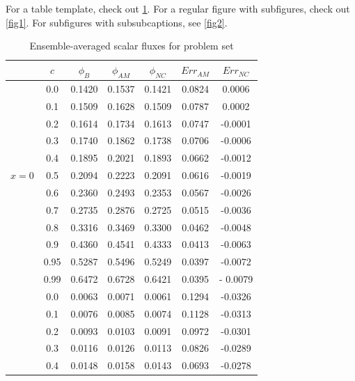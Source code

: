 \documentclass[12pt]{article}
\begin{document}
For a table template, check out \cref{tab1}. For a regular figure with subfigures, check out \cref{fig1}. For subfigures with subsubcaptions, see \cref{fig2}.

\pagebreak
\begin{singlespace}


\end{singlespace}

\begin{table}[p]
\centering
\caption{Ensemble-averaged scalar fluxes for problem set }
\label{tab1} 
\begin{tabular}{||c|c||c|c|c||c|c||} \hline \hline
  & $c$ & $\phi_B$ & $\phi_{AM}$ &$\phi_{NC}$ & $Err_{AM}$ & $ Err_{NC}$\\ \hline\hline
& 0.0 & 0.1420 & 0.1537 & 0.1421 & 0.0824 & 0.0006 \\
\cline{2-7}
& 0.1 & 0.1509 & 0.1628 & 0.1509 & 0.0787 & 0.0002 \\
\cline{2-7}
& 0.2 & 0.1614 & 0.1734 & 0.1613 & 0.0747 & -0.0001 \\
\cline{2-7}
& 0.3 & 0.1740 & 0.1862 & 0.1738 & 0.0706 & -0.0006 \\
\cline{2-7}
& 0.4 & 0.1895 & 0.2021 & 0.1893 & 0.0662 & -0.0012 \\
\cline{2-7}
$x=0$ & 0.5 & 0.2094 & 0.2223 & 0.2091 & 0.0616 &  -0.0019 \\
\cline{2-7}
& 0.6 & 0.2360 & 0.2493 & 0.2353 & 0.0567 & -0.0026 \\
\cline{2-7}
& 0.7 & 0.2735 & 0.2876 & 0.2725 & 0.0515 & -0.0036 \\
\cline{2-7}
& 0.8 & 0.3316 & 0.3469 & 0.3300 & 0.0462 & -0.0048 \\
\cline{2-7}
& 0.9 & 0.4360 & 0.4541 & 0.4333 & 0.0413 & -0.0063 \\
\cline{2-7}
& 0.95 & 0.5287 & 0.5496 & 0.5249 & 0.0397 & -0.0072 \\
\cline{2-7}
& 0.99 & 0.6472 & 0.6728 & 0.6421 & 0.0395 & - 0.0079  \\
\hline\hline
& 0.0 & 0.0063 & 0.0071 & 0.0061 & 0.1294 & -0.0326 \\
\cline{2-7}
& 0.1 & 0.0076 & 0.0085 & 0.0074 & 0.1128 & -0.0313 \\
\cline{2-7}
& 0.2 & 0.0093 & 0.0103 & 0.0091 & 0.0972 & -0.0301 \\
\cline{2-7}
& 0.3 & 0.0116 & 0.0126 & 0.0113 & 0.0826& -0.0289 \\
\cline{2-7}
& 0.4 & 0.0148 & 0.0158 & 0.0143 & 0.0693 & -0.0278 \\
\cline{2-7}

\end{tabular}
\end{table}
\end{document}

